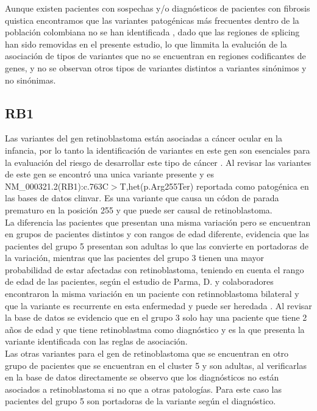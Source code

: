 Aunque existen pacientes con sospechas y/o diagnósticos de pacientes con fibrosis quistica encontramos que las variantes patogénicas más frecuentes dentro de la población colombiana no se han identificada \cite{Vasquez2010}, dado que las regiones de splicing han sido removidas en el presente estudio, lo que limmita la evalución de la asociación de tipos de variantes que no se encuentran en regiones codificantes de genes, y no se observan otros tipos de variantes distintos a variantes sinónimos y no sinónimas. 


\subsection*{RB1}

Las variantes del gen retinoblastoma están asociadas a cáncer ocular en la infancia, por lo tanto la identificación de variantes en este gen son esenciales para la evaluación del riesgo de desarrollar este tipo de cáncer \cite{Parma2017}. Al revisar las variantes de este gen se encontró una unica variante presente   y es NM\_000321.2(RB1):c.763C$>$T,het(p.Arg255Ter) reportada como patogénica en las bases de datos clinvar. Es una variante que causa un códon de parada prematuro en la posición 255 y que puede ser causal de retinoblastoma. \\  

La diferencia  las pacientes que presentan una misma variación pero se encuentran en grupos de pacientes distintos y con rangos de edad diferente, evidencia que las pacientes del grupo 5 presentan son adultas lo que las convierte en portadoras de la variación, mientras que las pacientes del grupo 3 tienen una mayor probabilidad de estar afectadas con retinoblastoma, teniendo en cuenta el rango de edad de las pacientes, según el estudio de Parma, D. y colaboradores encontraron la misma variación en un paciente con retinnoblastoma bilateral y que la variante es recurrente en esta enfermedad y puede ser heredada \cite{Parma2017}. Al revisar la base de datos se evidencio que en el grupo 3 solo hay una paciente que tiene 2 años de edad y que tiene retinoblastma como diagnóstico y es la que presenta la variante identificada con las reglas de asociación. \\

Las otras variantes para el gen de retinoblastoma que se encuentran en otro grupo de pacientes  que se encuentran en el cluster 5 y son adultas, al verificarlas en la base de datos directamente se observo que los diagnósticos no están asociados a retinoblastoma si no que a otras patologías. Para este caso las pacientes del grupo 5 son portadoras de la variante según el diagnóstico.\\ 

